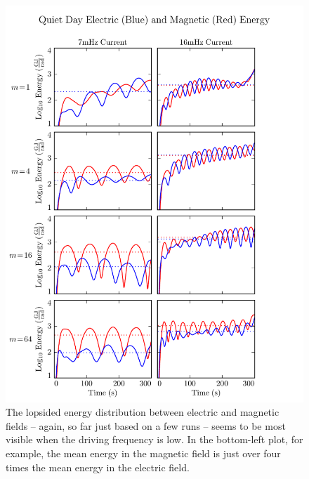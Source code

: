 \documentclass{article}
\begin{document}
\begin{figure}
  \includegraphics{UB_UE_slow.pdf}
  \caption{The lopsided energy distribution between electric and magnetic fields -- again, so far just based on a few runs -- seems to be most visible when the driving frequency is low. In the bottom-left plot, for example, the mean energy in the magnetic field is just over four times the mean energy in the electric field. }
  \label{fig_UB_UE_slow}
\end{figure}
\end{document}
